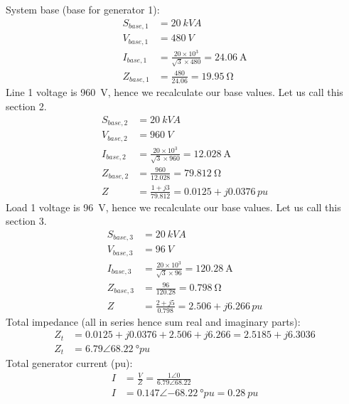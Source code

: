 System base (base for generator 1):
\begin{align}
    S_{base,1} & = \SI{20}{kVA}                                                   \\
    V_{base,1} & = \SI{480}{V}                                                    \\
    I_{base,1} & = \frac{20\times 10^3}{\sqrt{3}\times 480} = \SI{24.06}{\ampere} \\
    Z_{base,1} & = \frac{480}{24.06} = \SI{19.95}{\ohm}
\end{align}
Line 1 voltage is \SI{960}{\volt}, hence we recalculate our base values. Let us call this section 2.
\begin{align}
    S_{base,2} & = \SI{20}{kVA}                                                    \\
    V_{base,2} & = \SI{960}{V}                                                     \\
    I_{base,2} & = \frac{20\times 10^3}{\sqrt{3}\times 960} = \SI{12.028}{\ampere} \\
    Z_{base,2} & = \frac{960}{12.028} = \SI{79.812}{\ohm}                          \\
    Z          & = \frac{1+j3}{79.812} = 0.0125 + j0.0376\,\si{pu}
\end{align}
Load 1 voltage is \SI{96}{\volt}, hence we recalculate our base values. Let us call this section 3.
\begin{align}
    S_{base,3} & = \SI{20}{kVA}                                                   \\
    V_{base,3} & = \SI{96}{V}                                                     \\
    I_{base,3} & = \frac{20\times 10^3}{\sqrt{3}\times 96} = \SI{120.28}{\ampere} \\
    Z_{base,3} & = \frac{96}{120.28} = \SI{0.798}{\ohm}                           \\
    Z          & = \frac{2+j5}{0.798} = 2.506+j6.266\,\si{pu}
\end{align}
Total impedance (all in series hence sum real and imaginary parts):
\begin{align}
    Z_t & = 0.0125 + j0.0376 + 2.506 + j6.266 = 2.5185 + j6.3036 \\
    Z_t & = 6.79\angle\SI{68.22}{\degree pu}
\end{align}
Total generator current (pu):
\begin{align}
    I & = \frac{V}{Z} = \frac{1\angle 0}{6.79\angle 68.22}\\
    I & = 0.147\angle\SI{-68.22}{\degree pu} = \SI{0.28}{pu}
\end{align}
